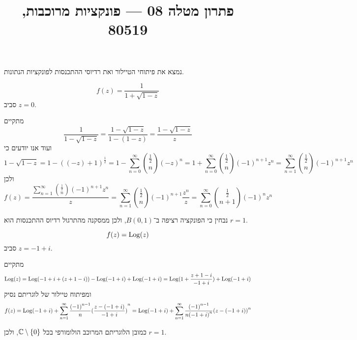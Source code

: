 
\title{פתרון מטלה 08 --- פונקציות מרוכבות, 80519}


\maketitle
\maketitleprint{}

\question{}
נמצא את פיתוחי הטיילור ואת רדיוסי ההתכנסות לפונקציות הנתונות.

\subquestion{}
\[
	f(z) = \frac{1}{1 + \sqrt{1 - z}}
\]
סביב $z = 0$.
\begin{solution}
	מתקיים
	\[
		\frac{1}{1 - \sqrt{1 - z}}
		= \frac{1 - \sqrt{1 - z}}{1 - (1 - z)}
		= \frac{1 - \sqrt{1 - z}}{z}
	\]
	ועוד אנו יודעים כי
	\[
		1 - \sqrt{1 - z}
		= 1 - {((-z) + 1)}^\frac{1}{2}
		= 1 - \sum_{n = 0}^{\infty} \binom{\frac{1}{2}}{n} {(-z)}^n
		= 1 + \sum_{n = 0}^{\infty} \binom{\frac{1}{2}}{n} {(-1)}^{n + 1} z^n
		= \sum_{n = 1}^{\infty} \binom{\frac{1}{2}}{n} {(-1)}^{n + 1} z^n
	\]
	ולכן
	\[
		f(z)
		= \frac{\sum_{n = 1}^{\infty} \binom{\frac{1}{2}}{n} {(-1)}^{n + 1} z^n}{z}
		= \sum_{n = 1}^{\infty} \binom{\frac{1}{2}}{n} {(-1)}^{n + 1} \frac{z^n}{z}
		= \sum_{n = 0}^{\infty} \binom{\frac{1}{2}}{n + 1} {(-1)}^n z^n
	\]

	נבחין כי הפונקציה רציפה ב־$B(0, 1)$, ולכן ממסקנה מהתרגול רדיוס ההתכנסות הוא $r = 1$.
\end{solution}

\subquestion{}
\[
	f(z) = \operatorname{Log}(z)
\]
סביב $z = -1 + i$.
\begin{solution}
	מתקיים
	\[
		\operatorname{Log}(z)
		= \operatorname{Log}(-1 + i + (z + 1 - i)) - \operatorname{Log}(-1 + i) + \operatorname{Log}(-1 + i)
		= \operatorname{Log}(1 + \frac{z + 1 - i}{-1 + i}) + \operatorname{Log}(-1 + i)
	\]
	ומפיתוח טיילור של לוגריתם נסיק
	\[
		f(z)
		= \operatorname{Log}(-1 + i) + \sum_{n = 1}^{\infty} \frac{{(-1)}^{n - 1}}{n} {(\frac{z - (-1 + i)}{-1 + i})}^n
		= \operatorname{Log}(-1 + i) + \sum_{n = 1}^{\infty} \frac{{(-1)}^{n - 1}}{n {(-1 + i)}^n} {(z - (-1 + i))}^n
	\]

	כמובן הלוגריתם המרוכב הולומורפי בכל $\mathbb{C} \setminus \{ 0 \}$, ולכן $r = 1$.
\end{solution}

